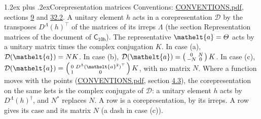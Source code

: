 \documentclass[10pt,a4paper]{article}
\makeatletter
\renewcommand\section{\@startsection{section}{1}{\z@}{-3ex plus -1ex minus -.2ex}%
  {1.2ex plus .2ex}{\normalfont\large\sffamily\bfseries\color{parttitle}}}
\numberwithin{equation}{section}
\newcommand{\eltfont}[1]{{\let\sigma\eltsigma\mathelt{#1}}}
\newcommand{\grp}[1]{\mathsf{#1}}
\newcommand{\elt}[1]{\eltfont{#1}}
\makeatother
\begin{document}
\section{Corepresentation matrices}\label{s:corep_matrices}
Conventions: \href{../../CONVENTIONS.pdf}{CONVENTIONS.pdf}, sections \href{../../../rotation/CONVENTIONS.pdf\#conv.9}{9} and \href{../../CONVENTIONS.pdf\#conv.32.2}{32.2}.
A unitary element $h$ acts in a corepresentation $\mathcal{D}$ by the transposes $D^{\Lambda}(h)^{\top}$ of the matrices of its irreps $\Lambda$ (the section Representation matrices of the document of \href{../../../rotation/data/pdf/C10h.pdf}{$\grp{C_{10h}}$}). The representative $\elt{a} = \varTheta$ acts by a unitary matrix times the complex conjugation $K$.
In case (a), $\mathcal{D}(\elt{a}) = NK$. In case (b), $\mathcal{D}(\elt{a}) = \left(\begin{smallmatrix} 0 & N \\ -N & 0 \end{smallmatrix}\right) K$. In case (c), $\mathcal{D}(\elt{a}) = \left(\begin{smallmatrix} 0 & D^{\Lambda}(\elt{a}^2)^{\top} \\ 1 & 0 \end{smallmatrix}\right) K$, with no matrix $N$.
Where a function moves with the points (\href{../../CONVENTIONS.pdf}{CONVENTIONS.pdf}, section \href{../../../rotation/CONVENTIONS.pdf\#conv.4.3}{4.3}), the corepresentation on the same kets is the complex conjugate of $\mathcal{D}$: a unitary element $h$ acts by $D^{\Lambda}(h)^{\dagger}$, and $N^{*}$ replaces $N$.
A row is a corepresentation, by its irreps. A row gives its case and its matrix $N$ (a dash in case (c)).
\end{document}
